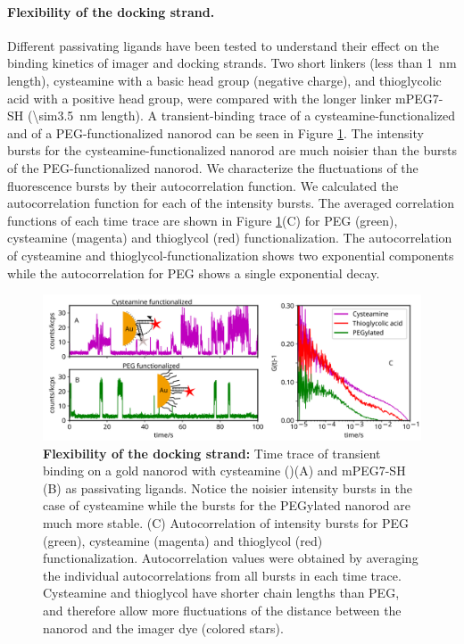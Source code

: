 \paragraph{Flexibility of the docking strand.} Different passivating ligands have been tested to understand their effect on the binding kinetics of imager and docking strands.
Two short linkers (less than \SI{1}{\nm} length), cysteamine with a basic head group (negative charge), and thioglycolic acid with a positive head group, were compared with the longer linker mPEG7-SH (\SI{\sim3.5}{\nm} length).
A transient-binding trace of a cysteamine-functionalized and of a PEG-functionalized nanorod can be seen in Figure \ref{fig:timetraceCysvsPeg}.
The intensity bursts for the cysteamine-functionalized nanorod are much noisier than the bursts of the PEG-functionalized nanorod.
We characterize the fluctuations of the fluorescence bursts by their autocorrelation function. We calculated the autocorrelation function for each of the intensity bursts. The averaged correlation functions of each time trace are shown in Figure \ref{fig:timetraceCysvsPeg}(C) for  PEG (green), cysteamine (magenta) and thioglycol (red) functionalization.
The autocorrelation of cysteamine and thioglycol-functionalization shows two exponential components while the autocorrelation for PEG shows a single exponential decay.
\begin{figure}[ht]
	\centering
	\includegraphics[width=\textwidth]{timetraceCysvsPeg}
	\caption{\textbf{Flexibility of the docking strand:} Time trace of transient binding on a gold nanorod with cysteamine ()(A) and mPEG7-SH (B) as passivating ligands.
	Notice the noisier intensity bursts in the case of cysteamine while the bursts for the PEGylated nanorod are much more stable.
	(C) Autocorrelation of intensity bursts for PEG (green), cysteamine (magenta) and thioglycol (red) functionalization.
	Autocorrelation values were obtained by averaging the individual autocorrelations from all bursts in each time trace. 
	Cysteamine and thioglycol have shorter chain lengths than PEG, and therefore allow more fluctuations of the distance between the nanorod and the imager dye (colored stars).}
  	\label{fig:timetraceCysvsPeg}
\end{figure}


